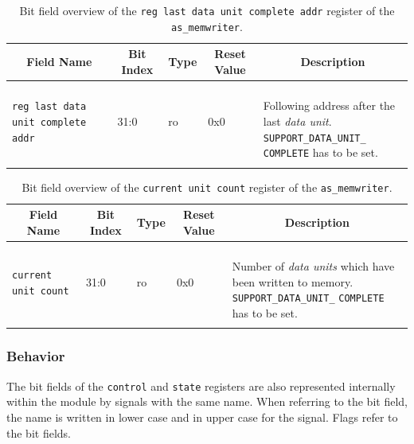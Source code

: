 \begin{longtable}[ht]{|l|l|l|l|l|}
    \hline
    \multicolumn{1}{|c|}{\textbf{Field Name}} & \multicolumn{1}{c|}{\textbf{Bit Index}} & \multicolumn{1}{c|}{\textbf{Type}} & \multicolumn{1}{c|}{\textbf{Reset Value}} & \multicolumn{1}{c|}{\textbf{Description}}\\
    \hline
    
    \parbox{3cm}{\texttt{reg last data unit complete addr}} & 31:0 & ro & 0x0 & \parbox{5cm}{\ \\
        Following address after the last \textit{data unit}.\\
        \texttt{SUPPORT\_DATA\_UNIT\_}\\
        \texttt{COMPLETE} has to be set.\\
    }\\
    \hline
    
    \caption{Bit field overview of the \texttt{reg last data unit complete addr} register of the \texttt{as\_memwriter}.}
    \label{table:memwriter-last-unit-addr}
\end{longtable}


\begin{longtable}[ht]{|l|l|l|l|l|}
    \hline
    \multicolumn{1}{|c|}{\textbf{Field Name}} & \multicolumn{1}{c|}{\textbf{Bit Index}} & \multicolumn{1}{c|}{\textbf{Type}} & \multicolumn{1}{c|}{\textbf{Reset Value}} & \multicolumn{1}{c|}{\textbf{Description}}\\
    \hline
    
    \texttt{current unit count} & 31:0 & ro & 0x0 & \parbox{5cm}{\ \\
        Number of \textit{data units} which have been written to memory.\\
        \texttt{SUPPORT\_DATA\_UNIT\_}
        \texttt{COMPLETE} has to be set.\\
    }\\
    \hline
    
    \caption{Bit field overview of the \texttt{current unit count} register of the \texttt{as\_memwriter}.}
    \label{table:memwriter-unit-count}
\end{longtable}


\subsubsection{Behavior}
The bit fields of the \texttt{control} and \texttt{state} registers are also represented internally within the module by signals with the same name.
When referring to the bit field, the name is written in lower case and in upper case for the signal.
Flags refer to the bit fields.

